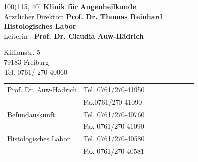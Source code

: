\documentclass[12pt]{g-brief}
\begin{document}
{

\begin{textblock}{100}(115, 40) 
\normalsize
\textbf{Klinik für Augenheilkunde} \\
\footnotesize
Ärztlicher Direktor: \textbf{Prof. Dr. Thomas Reinhard}\\


\textbf{Histologisches Labor}\\
Leiterin : \textbf{Prof. Dr. Claudia Auw-Hädrich}

\footnotesize
Killianstr. 5\\
79183 Freiburg\\
Tel. 0761/ 270-40060\\

\begin{tabular}{@{}p{0.4\linewidth}p{0.6\linewidth}}
Prof. Dr. Auw-Hädrich & Tel. 0761/270-41950 \\
 & Fax0761/270-41090\\[1.5mm]
 
 Befundauskunft & Tel. 0761/270-40760 \\
 & Fax 0761/270-41090\\[1.5mm]
 
  Histologisches Labor & Tel. 0761/270-40580 \\
 &Fax 0761/270-40581
 \end{tabular}
\end{textblock}
}



\begin{g-brief}
 \end{g-brief}
\end{document}
